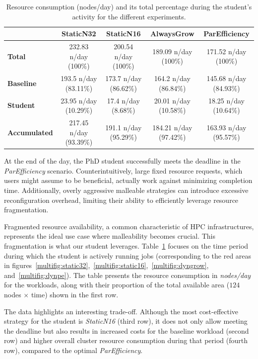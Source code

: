 \documentclass[a4paper,fleqn]{cas-dc}
\begin{document}
\begin{table}[tbp]
    \centering
    \fontsize{9.5pt}{20pt}\selectfont
    \begin{tabular}{lcccc}
        \toprule
        & \textbf{StaticN32} & \textbf{StaticN16} & \textbf{AlwaysGrow} & \textbf{ParEfficiency} \\
        \midrule
        \textbf{Total}    & 232.83 n/day (100\%)  & 200.54 n/day (100\%)  & 189.09 n/day (100\%)  & 171.52 n/day (100\%)  \\
        \textbf{Baseline} & 193.5 n/day (83.11\%) & 173.7 n/day (86.62\%) & 164.2 n/day (86.84\%) & 145.68 n/day (84.93\%) \\
        \textbf{Student}  & 23.95 n/day (10.29\%) & 17.4 n/day (8.68\%)   & 20.01 n/day (10.58\%) & 18.25 n/day (10.64\%)  \\
        \textbf{Accumulated} & 217.45 n/day (93.39\%)& 191.1 n/day (95.29\%) & 184.21 n/day (97.42\%)& 163.93 n/day (95.57\%) \\
        \bottomrule
    \end{tabular}
    \caption{Resource consumption (nodes/day) and its total percentage during the student's activity for the different experiments.}
    \label{tab:nodes-day}
\end{table}

At the end of the day, the PhD student successfully meets the deadline in the \textit{ParEfficiency} scenario. Counterintuitively, large fixed resource requests, which users might assume to be beneficial, actually work against minimizing completion time. Additionally, overly aggressive malleable strategies can introduce excessive reconfiguration overhead, limiting their ability to efficiently leverage resource fragmentation.  

Fragmented resource availability, a common characteristic of HPC infrastructures, represents the ideal use case where malleability becomes crucial. 
This fragmentation is what our student leverages.
Table~\ref{tab:nodes-day} focuses on the time period during which the student is actively running jobs (corresponding to the red areas in figures~\ref{multifig:static32},~\ref{multifig:static16},~\ref{multifig:dyngrow}, and~\ref{multifig:dynpe}). The table presents the resource consumption in \textit{nodes/day} for the workloads, along with their proportion of the total available area ($124$ nodes $\times$ time) shown in the first row.  

The data highlights an interesting trade-off. Although the most cost-effective strategy for the student is \textit{StaticN16} (third row), it does not only allow meeting the deadline but also results in increased costs for the baseline workload (second row) and higher overall cluster resource consumption during that period (fourth row), compared to the optimal \textit{ParEfficiency}.
\end{document}
